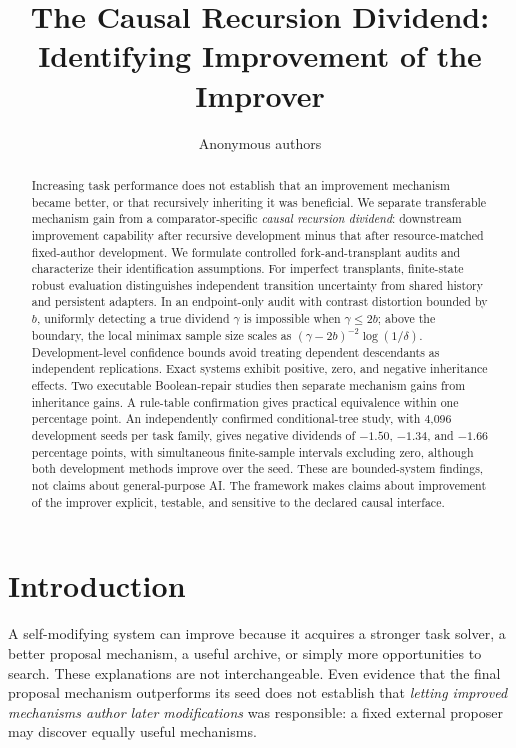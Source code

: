 \documentclass{article}
\title{The Causal Recursion Dividend:\\Identifying Improvement of the Improver}
\author{Anonymous authors}
\newif\ifresearchdraft
\theoremstyle{definition}
\begin{document}
\maketitle
\ifresearchdraft\lhead{Research draft in ICLR 2027 format; not submitted}\fi
\begin{abstract}
Increasing task performance does not establish that an improvement mechanism became better, or that recursively inheriting it was beneficial. We separate transferable mechanism gain from a comparator-specific \emph{causal recursion dividend}: downstream improvement capability after recursive development minus that after resource-matched fixed-author development. We formulate controlled fork-and-transplant audits and characterize their identification assumptions. For imperfect transplants, finite-state robust evaluation distinguishes independent transition uncertainty from shared history and persistent adapters. In an endpoint-only audit with contrast distortion bounded by $b$, uniformly detecting a true dividend $\gamma$ is impossible when $\gamma\leq2b$; above the boundary, the local minimax sample size scales as $(\gamma-2b)^{-2}\log(1/\delta)$. Development-level confidence bounds avoid treating dependent descendants as independent replications. Exact systems exhibit positive, zero, and negative inheritance effects. Two executable Boolean-repair studies then separate mechanism gains from inheritance gains. A rule-table confirmation gives practical equivalence within one percentage point. An independently confirmed conditional-tree study, with 4,096 development seeds per task family, gives negative dividends of $-1.50$, $-1.34$, and $-1.66$ percentage points, with simultaneous finite-sample intervals excluding zero, although both development methods improve over the seed. These are bounded-system findings, not claims about general-purpose AI. The framework makes claims about improvement of the improver explicit, testable, and sensitive to the declared causal interface.
\end{abstract}

\section{Introduction}
A self-modifying system can improve because it acquires a stronger task solver, a better proposal mechanism, a useful archive, or simply more opportunities to search. These explanations are not interchangeable. Even evidence that the final proposal mechanism outperforms its seed does not establish that \emph{letting improved mechanisms author later modifications} was responsible: a fixed external proposer may discover equally useful mechanisms.
\end{document}
